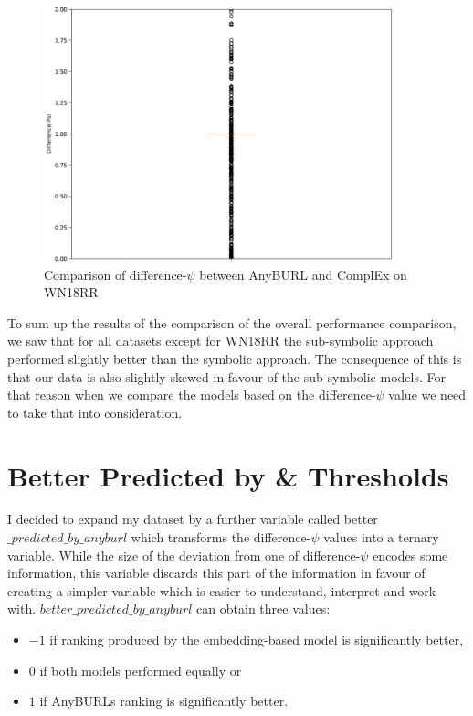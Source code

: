\begin{figure}[H]
\centering
\includegraphics[width=0.9\textwidth]{images/difference_psi_anyburl_complex_wnrr.PNG}
\caption{Comparison of difference-$\psi$ between AnyBURL and ComplEx on WN18RR}
\label{fig:difference_psi_anyburl_complex_wnrr}
\end{figure}

To sum up the results of the comparison of the overall performance comparison, we saw that for all datasets except for WN18RR the sub-symbolic approach performed slightly better than the symbolic approach. The consequence of this is that our data is also slightly skewed in favour of the sub-symbolic models. For that reason when we compare the models based on the difference-$\psi$ value we need to take that into consideration.

\section{Better Predicted by \& Thresholds}
I decided to expand my dataset by a further variable called better $\_predicted\_by\_anyburl$ which transforms the difference-$\psi$ values into a ternary variable. While the size of the deviation from one of difference-$\psi$ encodes some information, this variable discards this part of the information in favour of creating a simpler variable which is easier to understand, interpret and work with. $better\_predicted\_by\_anyburl$ can obtain three values:

\begin{itemize}
\item $-1$ if ranking produced by the embedding-based model is significantly better,
\item $0$ if both models performed equally or 
\item $1$ if AnyBURLs ranking is significantly better.
\end{itemize}

